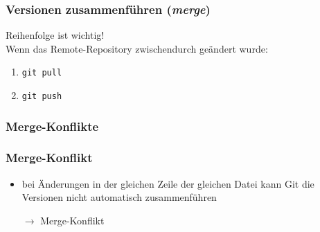\documentclass[accentcolor=tud8b,colorbacktitle,inverttitle,landscape,german,presentation,t]{tudbeamer}
\begin{document}
			\begin{frame}
				\frametitle{Versionen zusammenführen (\textit{merge})}
					Reihenfolge ist wichtig!\\ Wenn das Remote-Repository zwischendurch geändert wurde:
					\begin{enumerate}
						\item \texttt{git pull}
						\item \texttt{git push}
					\end{enumerate}
			\end{frame}
			
		\subsubsection{Merge-Konflikte}
			\begin{frame}
				\frametitle{Merge-Konflikt}
					\begin{itemize}
						\item bei Änderungen in der gleichen Zeile der gleichen Datei kann Git die Versionen nicht automatisch zusammenführen
						\item[$\rightarrow$] Merge-Konflikt
					\end{itemize}
			\end{frame}
			
\end{document}
